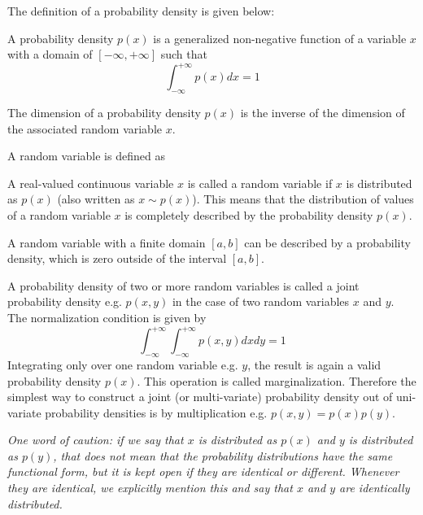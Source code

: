 \documentclass{tstextbook}
\begin{document}
The definition of a probability density is given below:

\begin{definition}
  \label{th:probabilitydensity}
  A probability density $p(x)$ is a generalized non-negative function of a variable
  $x$ with a domain of $[-\infty,+\infty]$ such that
  \begin{equation}
    \int_{-\infty}^{+\infty}p(x)dx=1
  \end{equation}
\end{definition}
The dimension of a probability density $p(x)$ is the inverse of the dimension of the associated random variable $x$.

A random variable is defined as
\begin{definition}
  \label{th:randomvariable}
  A real-valued continuous variable $x$ is called a random variable if $x$ is distributed as $p(x)$ (also written as $x\sim p(x)$). This means that the distribution of values of a random variable $x$ is completely described by the probability density $p(x)$.
\end{definition}

A random variable with a finite domain $[a,b]$ can be described by a probability density, which is zero outside of the interval $[a,b]$.

A probability density of two or more random variables is called a joint probability density e.g. $p(x,y)$ in the case of two random variables $x$ and $y$. The normalization condition is given by 
  \begin{equation}
    \int_{-\infty}^{+\infty}\int_{-\infty}^{+\infty}p(x,y)dxdy=1
  \end{equation}
Integrating only over one random variable e.g. $y$, the result is again a valid probability density $p(x)$. This operation is called marginalization. Therefore the simplest way to construct a joint (or multi-variate) probability density out of uni-variate probability densities is by multiplication e.g. $p(x,y)=p(x)p(y)$.

\begin{remark}
\textit{One word of caution: if we say that $x$ is distributed as $p(x)$ and $y$ is distributed as $p(y)$, that does not mean that the probability distributions have the same functional form, but it is kept open if they are identical or different. Whenever they are identical, we explicitly mention this and say that $x$ and $y$ are identically distributed.}
\end{remark}
\end{document}
